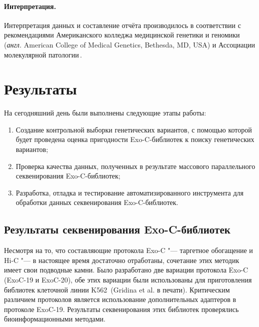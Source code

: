 \documentclass[a4paper,14pt]{extarticle}
\newcommand{\anglia}[1]{\textit{англ.} \textenglish{#1}}
\begin{document}
\paragraph{Интерпретация.}
Интерпретация данных и составление отчёта производилось в соответствии с рекомендациями Американского колледжа медицинской генетики и геномики (\anglia{American College of Medical Genetics, Bethesda, MD, USA}) и Ассоциации молекулярной патологии\,\cite{Richards_2015}.

\section{Результаты}

На сегодняшний день были выполнены следующие этапы работы:

\begin{enumerate}
\item Создание контрольной выборки генетических вариантов, с помощью которой будет проведена оценка пригодности Exo-C\hyp{}библиотек к поиску генетических вариантов;
\item Проверка качества данных, полученных в результате массового параллельного секвенирования Exo-C\hyp{}библиотек;
\item Разработка, отладка и тестирование автоматизированного инструмента для обработки данных секвенирования Exo-C\hyp{}библиотек.
\end{enumerate}

\subsection{Результаты секвенирования Exo-C\hyp{}библиотек}

Несмотря на то, что составляющие протокола Exo-C "--- таргетное обогащение и Hi-C "--- в настоящее время достаточно отработаны, сочетание этих методик имеет свои подводные камни.
Было разработано две вариации протокола Exo-C (ExoC-19 и ExoC-20), обе этих вариации были использованы для приготовления библиотек клеточной линии K562\,\cite{Ma_2018,Ramani_2016} (Gridina et al. в печати).
Критическим различием протоколов является использование дополнительных адаптеров в протоколе ExoC-19.
Результаты секвенирования этих библиотек проверялись биоинформационными методами.
\end{document}
